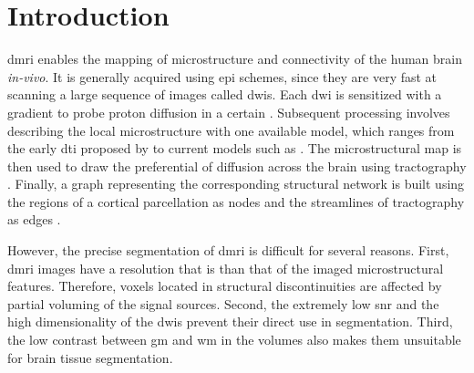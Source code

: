 \section{Introduction}\label{sec:regseg-intro}
\Gls*{dmri} enables the mapping of microstructure \citep{basser_microstructural_1996}
  and connectivity \citep{craddock_imaging_2013} of the human brain \emph{in-vivo}.
It is generally acquired using \gls*{epi} schemes, since they are very fast at
  scanning a large sequence of images called \glspl*{dwi}.
Each \gls*{dwi} is sensitized with a gradient to probe proton diffusion in a certain
  .
Subsequent processing involves describing the local microstructure with one available
  model, which ranges from the early \gls*{dti} proposed by \cite{basser_microstructural_1996}
  to current models such as \citep{daducci_accelerated_2015}.
The microstructural map is then used to draw the preferential  of diffusion
  across the brain using tractography \citep{mori_threedimensional_1999}.
Finally, a graph representing the corresponding structural network is built using
  the regions of a cortical parcellation as nodes and the streamlines of
  tractography as edges \citep{hagmann_mapping_2008}.

%
However, the precise segmentation of \gls*{dmri} is difficult for several reasons.
First, \gls{dmri} images have a resolution that is 
  than that of the imaged microstructural features.
Therefore, voxels located in structural discontinuities are affected by partial
  voluming of the signal sources.
Second, the extremely low \gls*{snr} and the high dimensionality of the \glspl*{dwi} prevent
  their direct use in segmentation.
Third, the low contrast between \gls*{gm} and \gls*{wm} in the \lowb{} volumes also makes
  them unsuitable for brain tissue segmentation.

